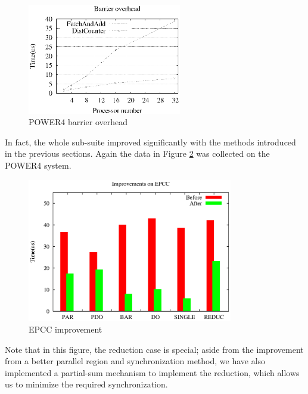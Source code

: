 \begin{figure}[!h]
  \begin{center}
    \includegraphics[angle=0, width=0.60\textwidth]{power4performance.eps}
    \caption{\footnotesize POWER4 barrier overhead}
    \label{fig:power4performance}
  \end{center}
\end{figure}

In fact, the whole sub-suite improved significantly with the methods
introduced in the previous sections. Again the data in Figure
\ref{fig:epcc} was collected on the POWER4 system.

\begin{figure}[!h]
  \begin{center}
    \includegraphics[angle=0, width=0.80\textwidth]{epcc.eps}
    \caption{\footnotesize EPCC improvement}
    \label{fig:epcc}
  \end{center}
\end{figure}

Note that in this figure, the reduction case is special; aside from
the improvement from a better parallel region and synchronization
method, we have also implemented a partial-sum mechanism to implement
the reduction, which allows us to minimize the required
synchronization.





